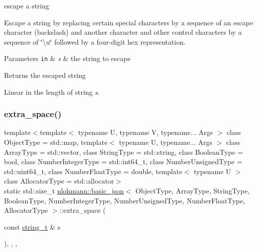 escape a string 

Escape a string by replacing certain special characters by a sequence of an escape character (backslash) and another character and other control characters by a sequence of \char`\"{}\textbackslash{}u\char`\"{} followed by a four-\/digit hex representation.


\begin{DoxyParams}[1]{Parameters}
\mbox{\tt in}  & {\em s} & the string to escape \\
\hline
\end{DoxyParams}
\begin{DoxyReturn}{Returns}
the escaped string
\end{DoxyReturn}
Linear in the length of string {\itshape s}. \hypertarget{classnlohmann_1_1basic__json_a2dda20e69a1778aa8f69c08eb05db146}{}\label{classnlohmann_1_1basic__json_a2dda20e69a1778aa8f69c08eb05db146} 
\subsubsection{\texorpdfstring{extra\+\_\+space()}{extra\_space()}}
{\footnotesize\ttfamily template$<$template$<$ typename U, typename V, typename... Args $>$ class Object\+Type = std\+::map, template$<$ typename U, typename... Args $>$ class Array\+Type = std\+::vector, class String\+Type  = std\+::string, class Boolean\+Type  = bool, class Number\+Integer\+Type  = std\+::int64\+\_\+t, class Number\+Unsigned\+Type  = std\+::uint64\+\_\+t, class Number\+Float\+Type  = double, template$<$ typename U $>$ class Allocator\+Type = std\+::allocator$>$ \\
static std\+::size\+\_\+t \hyperlink{classnlohmann_1_1basic__json}{nlohmann\+::basic\+\_\+json}$<$ Object\+Type, Array\+Type, String\+Type, Boolean\+Type, Number\+Integer\+Type, Number\+Unsigned\+Type, Number\+Float\+Type, Allocator\+Type $>$\+::extra\+\_\+space (\begin{DoxyParamCaption}\item[{const \hyperlink{classnlohmann_1_1basic__json_ab63e618bbb0371042b1bec17f5891f42}{string\+\_\+t} \&}]{s }\end{DoxyParamCaption})\hspace{0.3cm}{\ttfamily [inline]}, {\ttfamily [static]}, {\ttfamily [private]}, {\ttfamily [noexcept]}}



